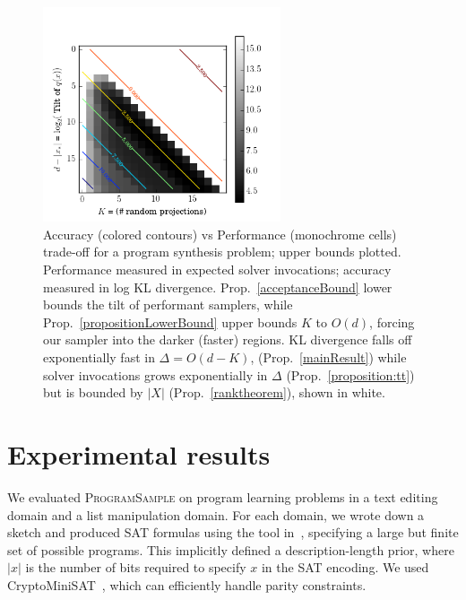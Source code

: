 \documentclass{article}
\newcommand{\theSystem}{\textsc{ProgramSample}}
\begin{document}
  \begin{figure}
    \includegraphics[width=7cm]{trade-off.png}
    \caption{Accuracy (colored contours) vs Performance (monochrome cells) trade-off for a program synthesis problem; upper bounds plotted. Performance measured in expected solver invocations; accuracy measured in log KL divergence. Prop.~\ref{acceptanceBound} lower bounds the tilt of performant samplers, while  Prop.~\ref{propositionLowerBound} upper bounds $K$ to $O(d)$, forcing our sampler into the darker (faster) regions.  KL divergence falls off exponentially fast in $\Delta = O(d - K)$, (Prop.~\ref{mainResult}) while solver invocations grows exponentially in $\Delta$ (Prop.~\ref{proposition:tt}) but is bounded by $|X|$ (Prop.~\ref{ranktheorem}), shown in white.}\label{heat}
    \end{figure}
     
  \section{Experimental results}

  We evaluated \theSystem{} on program learning problems in a text editing domain and a list manipulation domain.
  For each domain, we wrote down a sketch and produced SAT formulas using the tool in~\cite{solar2006combinatorial}, specifying a large but finite set of possible programs.
  This implicitly defined a description-length prior, where $\lvert x \rvert $ is the number of bits required to specify $x$ in the SAT encoding.
We used   CryptoMiniSAT~\cite{crypto}, which can efficiently handle parity constraints.
  
\end{document}
